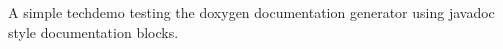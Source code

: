 A simple techdemo testing the doxygen documentation generator using javadoc style documentation blocks. 